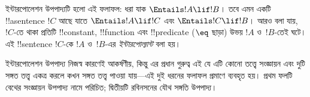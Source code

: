 \documentclass[../../../include/open-logic-section]{subfiles}
\begin{document}


ইন্টারপোলেশন উপপাদ্যটি হলো এই ফলাফল: ধরা যাক
$\Entails !A \lif !B$। তবে এমন একটি !!a{sentence} $!C$ আছে যাতে
$\Entails !A \lif !C$ এবং $\Entails !C \lif !B$। আরও বলা যায়, $!C$-তে
থাকা প্রতিটি !!{constant}, !!{function} এবং !!{predicate} ($\eq$ ছাড়া)
উভয় $!A$ ও~$!B$-তেই ঘটে। এই !!{sentence} $!C$-কে $!A$ ও~$!B$-এর
\emph{ইন্টারপোল্যান্ট} বলা হয়।

ইন্টারপোলেশন উপপাদ্য নিজস্ব কারণেই আকর্ষণীয়, কিন্তু এর প্রধান গুরুত্ব
এই যে এটি কোনো তত্ত্বে সংজ্ঞায়ন এবং দুটি সঙ্গত তত্ত্ব একত্র করলে কখন
সঙ্গত তত্ত্ব পাওয়া যায়—এই দুই ধরনের ফলাফল প্রমাণে ব্যবহৃত হয়। প্রথম
ফলটি বেথের সংজ্ঞায়ন উপপাদ্য নামে পরিচিত; দ্বিতীয়টি রবিনসনের যৌথ
সঙ্গতি উপপাদ্য।
\end{document}
